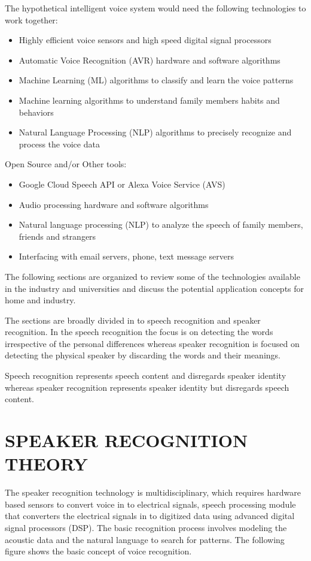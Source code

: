 \documentclass[sigconf]{acmart}
\begin{document}
The hypothetical intelligent voice system would need the following technologies to work together:
 \begin{itemize}
     \item Highly efficient voice sensors and high speed digital signal processors
     \item Automatic Voice Recognition (AVR) hardware and software algorithms
     \item Machine Learning (ML) algorithms to classify and learn the voice patterns
     \item Machine learning algorithms to understand family members habits and behaviors
     \item Natural Language Processing (NLP) algorithms to precisely recognize and process the voice data
 \end{itemize}
 
 Open Source and/or Other tools:
 \begin{itemize}
     \item Google Cloud Speech API or Alexa Voice Service (AVS)
     \item Audio processing hardware and software algorithms
     \item Natural language processing (NLP) to analyze the speech of family members, friends and strangers
     \item Interfacing with email servers, phone, text message servers
 \end{itemize}
 
 The following sections are organized to review some of the technologies available in the industry and universities and discuss the potential application concepts for home and industry.
 
   The sections are broadly divided in to speech recognition and speaker recognition. In the speech
recognition the focus is on detecting the words irrespective of the personal differences whereas speaker recognition is focused on detecting the physical speaker by discarding the words and their meanings.

   Speech recognition represents speech content and disregards speaker identity whereas speaker 
recognition represents speaker identity but disregards speech content.

\section{SPEAKER RECOGNITION THEORY}
The speaker recognition technology is multidisciplinary, which requires hardware based sensors to convert voice in to electrical signals, speech processing module that converters the electrical signals in to digitized data using advanced digital signal processors (DSP). The basic recognition process involves modeling the acoustic data and the natural language to search for patterns. The following figure shows the basic concept of voice recognition.
\end{document}
